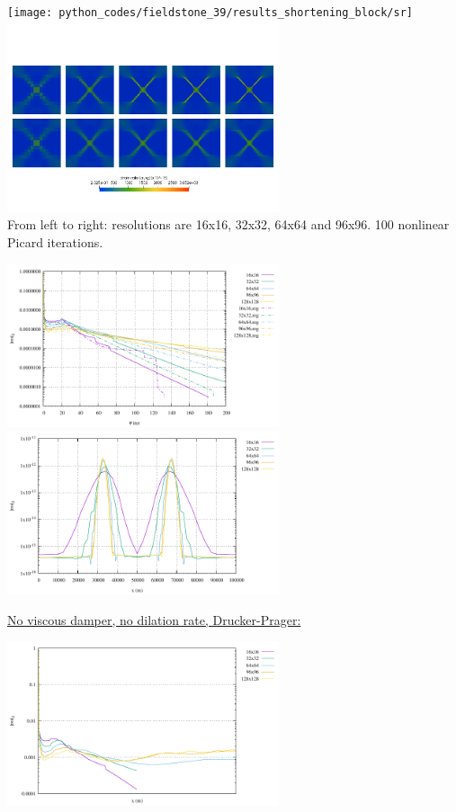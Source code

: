 \begin{center}
\texttt{[image: python\_codes/fieldstone\_39/results\_shortening\_block/sr]}
\includegraphics[width=8cm]{python_codes/fieldstone_39/results_shortening_block/sr_elt}\\
{\captionfont From left to right: resolutions are 16x16, 32x32, 64x64 and 96x96. 100 nonlinear Picard iterations.}
\end{center}

\begin{center}
\includegraphics[width=8cm]{python_codes/fieldstone_39/results_shortening_block/conv_vM.pdf}
\includegraphics[width=8cm]{python_codes/fieldstone_39/results_shortening_block/sr_line_vM.pdf}
\end{center}




\newpage
\underline{No viscous damper, no dilation rate, Drucker-Prager:}


\begin{center}
\includegraphics[width=8cm]{python_codes/fieldstone_39/results_shortening_block/conv_DP.pdf}
\end{center}






